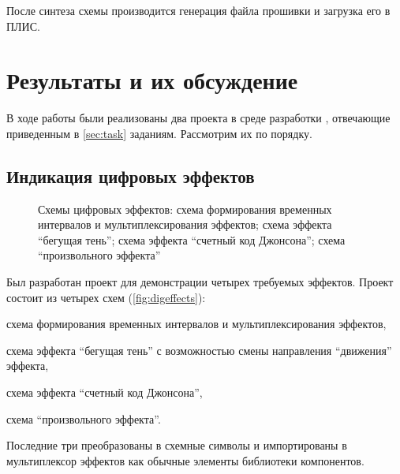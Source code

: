 После синтеза схемы производится генерация файла прошивки и загрузка его в ПЛИС.

\section{Результаты и их обсуждение}

В ходе работы были реализованы два проекта в среде разработки , отвечающие приведенным в \autoref{sec:task} заданиям. Рассмотрим их по порядку.

\subsection{Индикация цифровых эффектов}

\begin{figure}[h]%
\centering
%
%
\hspace{8pt}%
%
%
\hspace{8pt}%
%
%
\hspace{8pt}%
%
%
\hspace{8pt}%
%
\caption[Схемы цифровых эффектов.]{Схемы цифровых эффектов:
 схема формирования временных интервалов и мультиплексирования эффектов; %
 схема эффекта \enquote{бегущая тень}; %
 схема эффекта \enquote{счетный код Джонсона}; %
 схема \enquote{произвольного эффекта}} %
\label{fig:digeffects}%
\end{figure}

Был разработан проект для демонстрации четырех требуемых эффектов. Проект состоит из четырех схем (\autoref{fig:digeffects}):
%
\begin{enumerate*}[label=\asbuk*)]

\item схема формирования временных интервалов и мультиплексирования эффектов,

\item схема эффекта \enquote{бегущая тень} с возможностью смены направления \enquote{движения} эффекта,

\item схема эффекта \enquote{счетный код Джонсона},

\item схема \enquote{произвольного эффекта}.
\end{enumerate*}
%
Последние три преобразованы в схемные символы и импортированы в мультиплексор эффектов как обычные элементы библиотеки компонентов.

